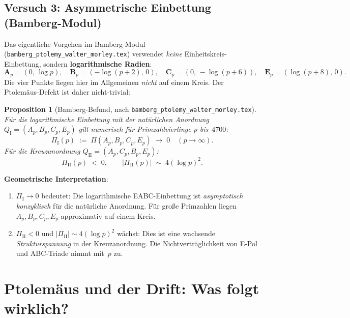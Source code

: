 \documentclass[12pt,a4paper]{article}
\newtheorem{proposition}[definition]{Proposition}
\newcommand{\Ptol}{\Pi}             %
\begin{document}
\subsection{Versuch 3: Asymmetrische Einbettung (Bamberg-Modul)}

Das eigentliche Vorgehen im Bamberg-Modul (\texttt{bamberg\_ptolemy\_walter\_morley.tex})
verwendet \emph{keine} Einheitskreis-Einbettung, sondern \textbf{logarithmische
Radien}:
\[
  \mathbf{A}_p = (0,\,\log p),\quad
  \mathbf{B}_p = (-\log(p+2),\,0),\quad
  \mathbf{C}_p = (0,\,-\log(p+6)),\quad
  \mathbf{E}_p = (\log(p+8),\,0).
\]
Die vier Punkte liegen hier im Allgemeinen \emph{nicht} auf einem Kreis.
Der Ptolemäus-Defekt ist daher nicht-trivial:

\begin{proposition}[Bamberg-Befund, nach \texttt{bamberg\_ptolemy\_walter\_morley.tex}]
\label{prop:bamberg}
Für die logarithmische Einbettung mit der natürlichen Anordnung $Q_{\mathrm I} = (A_p, B_p, C_p, E_p)$
gilt numerisch für Primzahlvierlinge $p$ bis~$4700$:
\[
  \Ptol_{\mathrm I}(p) \;:=\; \Ptol(A_p,B_p,C_p,E_p) \;\longrightarrow\; 0
  \quad (p \to \infty).
\]
Für die Kreuzanordnung $Q_{\mathrm{II}} = (A_p, C_p, B_p, E_p)$:
\[
  \Ptol_{\mathrm{II}}(p) \;<\; 0, \qquad
  |\Ptol_{\mathrm{II}}(p)| \;\sim\; 4(\log p)^2.
\]
\end{proposition}

\begin{tcolorbox}[ptolstil]
\textbf{Geometrische Interpretation}:
\begin{enumerate}[leftmargin=*, label=(\roman*)]
  \item $\Ptol_{\mathrm{I}} \to 0$ bedeutet: Die logarithmische EABC-Einbettung
    ist \emph{asymptotisch konzyklisch} für die natürliche Anordnung.
    Für große Primzahlen liegen $A_p, B_p, C_p, E_p$ approximativ auf einem Kreis.
  \item $\Ptol_{\mathrm{II}} < 0$ und $|\Ptol_{\mathrm{II}}| \sim 4(\log p)^2$
    wächst: Dies ist eine wachsende \emph{Strukturspannung} in der
    Kreuzanordnung. Die Nichtverträglichkeit von E-Pol und ABC-Triade
    nimmt mit~$p$ zu.
\end{enumerate}
\end{tcolorbox}

\section{Ptolemäus und der Drift: Was folgt wirklich?}
\label{sec:drift}
\end{document}
